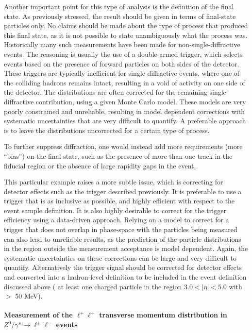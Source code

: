 Another important point for this type of analysis is the definition of
the final state. As previously stressed, the result should be given in
terms of final-state particles only. No claims should be made about the
type of process that produced this final state, as it is not possible to
state unambiguously what the process was.  Historically many such
measurements have been made for non-single-diffractive events.  The reasoning is usually the use of
a double-armed trigger, which selects events based on the presence of
forward particles on both sides of the detector. These triggers are
typically inefficient for single-diffractive events, where one of the
colliding hadrons remains intact, resulting in a void of activity on one
side of the detector.  The distributions are often corrected for the
remaining single-diffractive contribution, using a given Monte Carlo model. These
models are very poorly constrained and unreliable, resulting in model
dependent corrections with systematic uncertainties that are very
difficult to quantify. A preferable approach is to leave the
distributions uncorrected for a certain type of process.

To further suppress diffraction, one would instead add more requirements
(more ``bias'') on the final state, such as the presence of more than
one track in the fiducial region or the absence of large rapidity
gaps in the event.

This particular example raises a more subtle issue, which is correcting
for detector effects such as the trigger described previously. It is
preferable to use a trigger that is as inclusive as possible, and highly
efficient with respect to the event sample definition. It is also highly
desirable to correct for the trigger efficiency using a data-driven
approach. Relying on a model to correct for a trigger that does not
overlap in phase-space with the particles being measured can also lead
to unreliable results, as the prediction of the particle distributions
in the region outside the measurement acceptance is model dependent.
Again, the systematic uncertainties on these corrections can be large
and very difficult to quantify. Alternatively the trigger signal should
be corrected for detector effects and converted into a hadron-level
definition to be included in the event definition discussed above (\eg
at least one charged particle in the region  $3.0 < |\eta| < 5.0$ with
\pt\ $>$ 50 MeV).


\paragraph{Measurement of the $\ell^+\ell^-$ transverse momentum
distribution in $Z^0/\gamma* \rightarrow \ell^+\ell^-$ events}

